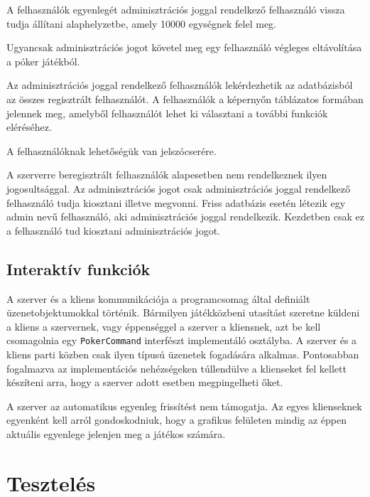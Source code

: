 A felhasználók egyenlegét adminisztrációs joggal rendelkező felhasználó vissza tudja állítani alaphelyzetbe, amely 10000 egységnek felel meg.

Ugyancsak adminisztrációs jogot követel meg egy felhasználó végleges eltávolítása a póker játékból.

Az adminisztrációs joggal rendelkező felhasználók lekérdezhetik az adatbázisból az összes regisztrált felhasználót. A felhasználók a képernyőn táblázatos formában jelennek meg, amelyből felhasználót lehet ki választani a további funkciók eléréséhez.

A felhasználóknak lehetőségük van jelszócserére.

A szerverre beregisztrált felhasználók alapesetben nem rendelkeznek ilyen jogosultsággal. Az adminisztrációs jogot csak adminisztrációs joggal rendelkező felhasználó tudja kiosztani illetve megvonni. Friss adatbázis esetén létezik egy admin nevű felhasználó, aki adminisztrációs joggal rendelkezik. Kezdetben csak ez a felhasználó tud kiosztani adminisztrációs jogot.

\subsection{Interaktív funkciók}
A szerver és a kliens kommunikációja a programcsomag által definiált üzenetobjektumokkal történik. Bármilyen játékközbeni utasítást szeretne küldeni a kliens a szervernek, vagy éppenséggel a szerver a kliensnek, azt be kell csomagolnia egy \texttt{PokerCommand} interfészt implementáló osztályba. A szerver és a kliens parti közben csak ilyen típusú üzenetek fogadására alkalmas. Pontosabban fogalmazva az implementációs nehézségeken túllendülve a klienseket fel kellett készíteni arra, hogy a szerver adott esetben megpingelheti őket.

A szerver az automatikus egyenleg frissítést nem támogatja. Az egyes klienseknek egyenként kell arról gondoskodniuk, hogy a grafikus felületen mindig az éppen aktuális egyenlege jelenjen meg a játékos számára.

\section{Tesztelés}

